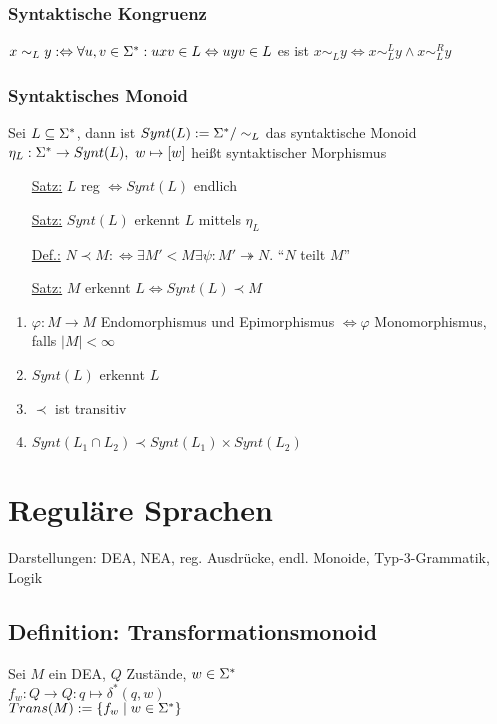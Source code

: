         \subsubsection{Syntaktische Kongruenz}
            $x\sim_L y :\Leftrightarrow \forall u,v\in\Sigma^*:uxv\in L\Leftrightarrow uyv\in L$ es ist $x\sim_L y\Leftrightarrow x\sim_L^L y\wedge x\sim_L^R y$
        \subsubsection{Syntaktisches Monoid}
            Sei $L\subseteq\Sigma^*$, dann ist $Synt(L):=\Sigma^*/\sim_L$ das syntaktische Monoid\\
            $\eta_L:\Sigmas\rightarrow Synt(L),\ w\mapsto[w]$ heißt syntaktischer Morphismus
            \begin{itemize}
                \item[\underline{Satz:}] $L$ reg $\Leftrightarrow Synt(L)$ endlich
                \item[\underline{Satz:}] $Synt(L)$ erkennt $L$ mittels $\eta_L$
                \item[\underline{Def.:}] $N\prec M :\Leftrightarrow \exists M'<M\exists\psi:M'\twoheadrightarrow N$. ``$N$ teilt $M$''
                \item[\underline{Satz:}] $M$ erkennt $L\Leftrightarrow Synt(L)\prec M$
            \end{itemize}
            \begin{enumerate}[1)]
                \item $\varphi:M\rightarrow M$ Endomorphismus und Epimorphismus $\Leftrightarrow \varphi$ Monomorphismus, falls $|M|<\infty$
                \item $Synt(L)$ erkennt $L$
                \item $\prec$ ist transitiv
                \item $Synt(L_1\cap L_2)\prec Synt(L_1)\times Synt(L_2)$
            \end{enumerate}
\section{Reguläre Sprachen}
    Darstellungen: DEA, NEA, reg. Ausdrücke, endl. Monoide, Typ-3-Grammatik, Logik
    \subsection{Definition: Transformationsmonoid}
        Sei $M$ ein DEA, $Q$ Zustände, $w\in\Sigma^*$\\
        $f_w:Q\rightarrow Q: q\mapsto \delta^*(q,w)$\\
        $Trans(M):=\{f_w\mid w\in\Sigma^*\}$
